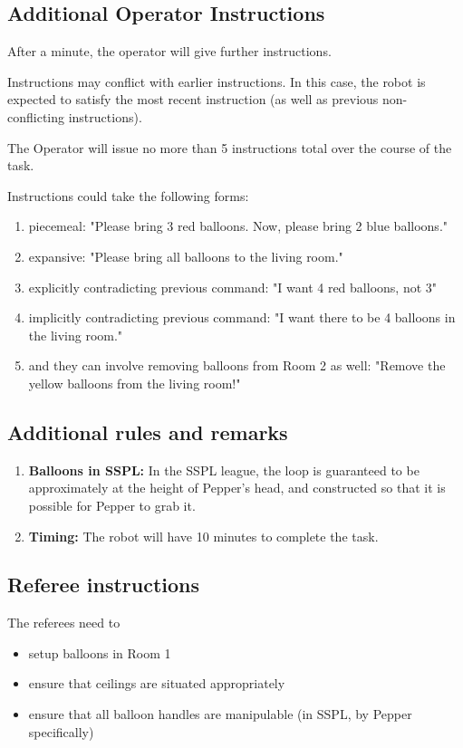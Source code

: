 \subsection{Additional Operator Instructions}

After a minute, the operator will give further instructions.

Instructions may conflict with earlier instructions.  In this case, the robot is expected to satisfy the most recent instruction (as well as previous non-conflicting instructions).

The Operator will issue no more than 5 instructions total over the course of the task.

Instructions could take the following forms:
\begin{enumerate}
	\item piecemeal: "Please bring 3 red balloons.  Now, please bring 2 blue balloons."
	\item expansive: "Please bring all balloons to the living room."
	\item explicitly contradicting previous command: "I want 4 red balloons, not 3"
	\item implicitly contradicting previous command: "I want there to be 4 balloons in the living room."
	\item and they can involve removing balloons from Room 2 as well: "Remove the yellow balloons from the living room!"
\end{enumerate}


\subsection{Additional rules and remarks}
\begin{enumerate}
	\item \textbf{Balloons in SSPL:} In the SSPL league, the loop is guaranteed to be approximately at the height of Pepper's head, and constructed so that it is possible for Pepper to grab it.

	\item \textbf{Timing:} The robot will have 10 minutes to complete the task.

\end{enumerate}

\subsection{Referee instructions}

The referees need to
\begin{itemize}
	\item setup balloons in Room 1
	\item ensure that ceilings are situated appropriately
	\item ensure that all balloon handles are manipulable (in SSPL, by Pepper specifically)
\end{itemize}

